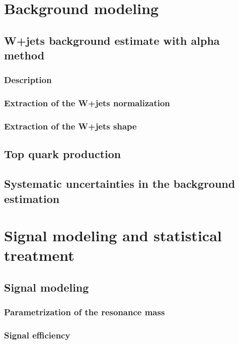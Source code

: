 \chapter{Background modeling}
\label{ch:bkgModel}


\section{W+jets background estimate with alpha method}
 \subsection{Description}
 \subsection{Extraction of the W+jets normalization}
 \subsection{Extraction of the W+jets shape}

\section{Top quark production}

\section{Systematic uncertainties in the background estimation}

\chapter{Signal modeling and statistical treatment}
\label{ch:sigModel}

\section{Signal modeling}
 \subsection{Parametrization of the resonance mass}
 \subsection{Signal efficiency}

